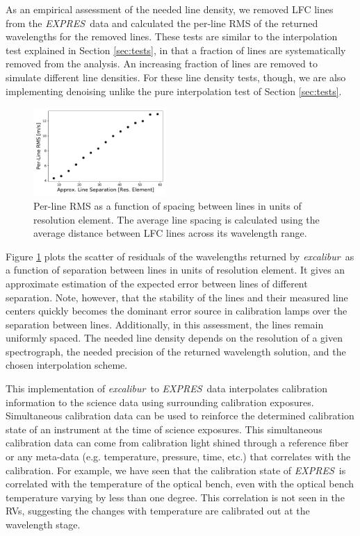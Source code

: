 \documentclass[twocolumn,table,xcolor,trackchanges]{aastex63}
\newcommand{\project}[1]{\textsl{#1}}
\newcommand{\name}{\project{excalibur}}
\newcommand{\acronym}[1]{{\small{#1}}}
\newcommand{\expres}{\project{\acronym{EXPRES}}}
\begin{document}
As an empirical assessment of the needed line density, we removed LFC lines from the \expres\ data and calculated the per-line RMS of the returned wavelengths for the removed lines.  These tests are similar to the interpolation test explained in Section \ref{sec:tests}, in that a fraction of lines are systematically removed from the analysis.  An increasing fraction of lines are removed to simulate different line densities.  For these line density tests, though, we are also implementing denoising unlike the pure interpolation test of Section \ref{sec:tests}.

\begin{figure}[b]
\centering
\includegraphics[width=0.45\textwidth]{Figures/lfcDensityTest.pdf}
\caption{Per-line RMS as a function of spacing between lines in units of resolution element.  The average line spacing is calculated using the average distance between LFC lines across its wavelength range.}
\label{fig:density}
\end{figure}

Figure \ref{fig:density} plots the scatter of residuals of the wavelengths returned by \name\ as a function of separation between lines in units of resolution element.  It gives an approximate estimation of the expected error between lines of different separation.  Note, however, that the stability of the lines and their measured line centers quickly becomes the dominant error source in calibration lamps over the separation between lines.  Additionally, in this assessment, the lines remain uniformly spaced.  The needed line density depends on the resolution of a given spectrograph, the needed precision of the returned wavelength solution, and the chosen interpolation scheme.

This implementation of \name\ to \expres\ data interpolates calibration information to the science data using surrounding calibration exposures.  Simultaneous calibration data can be used to reinforce the determined calibration state of an instrument at the time of science exposures.  This simultaneous calibration data can come from calibration light shined through a reference fiber or any meta-data (e.g. temperature, pressure, time, etc.) that correlates with the calibration.  For example, we have seen that the calibration state of \expres\ is correlated with the temperature of the optical bench, even with the optical bench temperature varying by less than one degree.  This correlation is not seen in the RVs, suggesting the changes with temperature are calibrated out at the wavelength stage.
\end{document}

